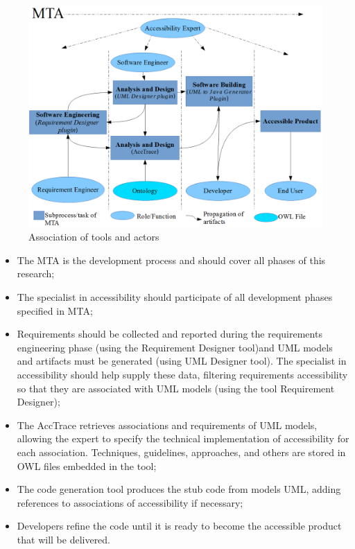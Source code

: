 \documentclass[10pt, conference, compsocconf]{IEEEtran}
\begin{document}
\begin{figure}[h!]
\centering
\includegraphics[scale=0.33]{./img/developmentNew2.png}
\caption{Association of tools and actors}
\label{fig:association}
\end{figure}


\begin{itemize}
  \item The MTA is the development process and should cover all phases of this research;
  \item The specialist in accessibility should participate of all development phases
specified in MTA;
  \item Requirements should be collected and reported during the requirements engineering phase
(using  the Requirement Designer tool)and UML models and artifacts
must be generated (using UML Designer tool). The specialist in accessibility should help supply these data, filtering requirements
accessibility so that they are associated with UML models (using the tool Requirement Designer);
  \item The AccTrace retrieves associations and requirements of UML models, allowing the expert to specify the technical implementation of accessibility for each association. Techniques, guidelines, approaches, and others are stored in OWL files embedded in the tool;
    \item The code generation tool produces the stub code from models
UML, adding references to associations of accessibility if necessary;
  \item Developers refine the code until it is ready to become the
accessible product that will be delivered.
\end{itemize}
\end{document}
